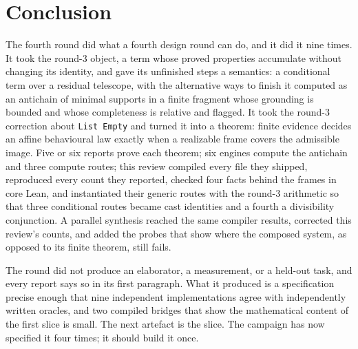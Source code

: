 \documentclass[11pt,a4paper]{article}
\newcommand{\code}[1]{\nolinkurl{#1}}
\theoremstyle{definition}
\theoremstyle{plain}
\begin{document}
\section{Conclusion}
The fourth round did what a fourth design round can do, and it did it nine times. It took the round-3 object, a term whose proved properties accumulate without changing its identity, and gave its unfinished steps a semantics: a conditional term over a residual telescope, with the alternative ways to finish it computed as an antichain of minimal supports in a finite fragment whose grounding is bounded and whose completeness is relative and flagged. It took the round-3 correction about \code{List Empty} and turned it into a theorem: finite evidence decides an affine behavioural law exactly when a realizable frame covers the admissible image. Five or six reports prove each theorem; six engines compute the antichain and three compute routes; this review compiled every file they shipped, reproduced every count they reported, checked four facts behind the frames in core Lean, and instantiated their generic routes with the round-3 arithmetic so that three conditional routes became cast identities and a fourth a divisibility conjunction. A parallel synthesis reached the same compiler results, corrected this review's counts, and added the probes that show where the composed system, as opposed to its finite theorem, still fails.

The round did not produce an elaborator, a measurement, or a held-out task, and every report says so in its first paragraph. What it produced is a specification precise enough that nine independent implementations agree with independently written oracles, and two compiled bridges that show the mathematical content of the first slice is small. The next artefact is the slice. The campaign has now specified it four times; it should build it once.

\clearpage
\appendix

\end{document}
